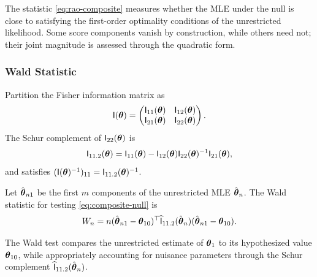 \begin{remark}
The statistic \eqref{eq:rao-composite} measures whether the MLE under the null
is close to satisfying the first-order optimality conditions of the unrestricted likelihood.
Some score components vanish by construction, while others need not;
their joint magnitude is assessed through the quadratic form.
\end{remark}

\subsubsection{Wald Statistic}

\begin{definition}\label{def:partition-info}
Partition the Fisher information matrix as
\begin{equation*}\label{eq:info-partition}
\mathsf{I}(\boldsymbol{\theta})
=
\begin{pmatrix}
\mathsf{I}_{11}(\boldsymbol{\theta}) & \mathsf{I}_{12}(\boldsymbol{\theta}) \\
\mathsf{I}_{21}(\boldsymbol{\theta}) & \mathsf{I}_{22}(\boldsymbol{\theta})
\end{pmatrix}.
\end{equation*}
The Schur complement of \(\mathsf{I}_{22}(\boldsymbol{\theta})\) is
\begin{equation*}\label{eq:schur}
\mathsf{I}_{11.2}(\boldsymbol{\theta})
=
\mathsf{I}_{11}(\boldsymbol{\theta})
-
\mathsf{I}_{12}(\boldsymbol{\theta})
\mathsf{I}_{22}(\boldsymbol{\theta})^{-1}
\mathsf{I}_{21}(\boldsymbol{\theta}),
\end{equation*}
and satisfies
\((\mathsf{I}(\boldsymbol{\theta})^{-1})_{11} = \mathsf{I}_{11.2}(\boldsymbol{\theta})^{-1}\).
\end{definition}

\begin{definition}\label{def:wald-composite}
Let \(\hat{\boldsymbol{\theta}}_{n1}\) be the first \(m\) components of the unrestricted MLE \(\hat{\boldsymbol{\theta}}_n\).
The Wald statistic for testing \eqref{eq:composite-null} is
\begin{equation*}\label{eq:wald-composite}
W_n
=
n
(\hat{\boldsymbol{\theta}}_{n1} - \boldsymbol{\theta}_{10})^{\top}
\widehat{\mathsf{I}}_{11.2}(\hat{\boldsymbol{\theta}}_n)
(\hat{\boldsymbol{\theta}}_{n1} - \boldsymbol{\theta}_{10}).
\end{equation*}
\end{definition}

\begin{remark}
The Wald test compares the unrestricted estimate of \(\boldsymbol{\theta}_1\)
to its hypothesized value \(\boldsymbol{\theta}_{10}\),
while appropriately accounting for nuisance parameters through the
Schur complement \(\widehat{\mathsf{I}}_{11.2}(\hat{\boldsymbol{\theta}}_n)\).
\end{remark}

